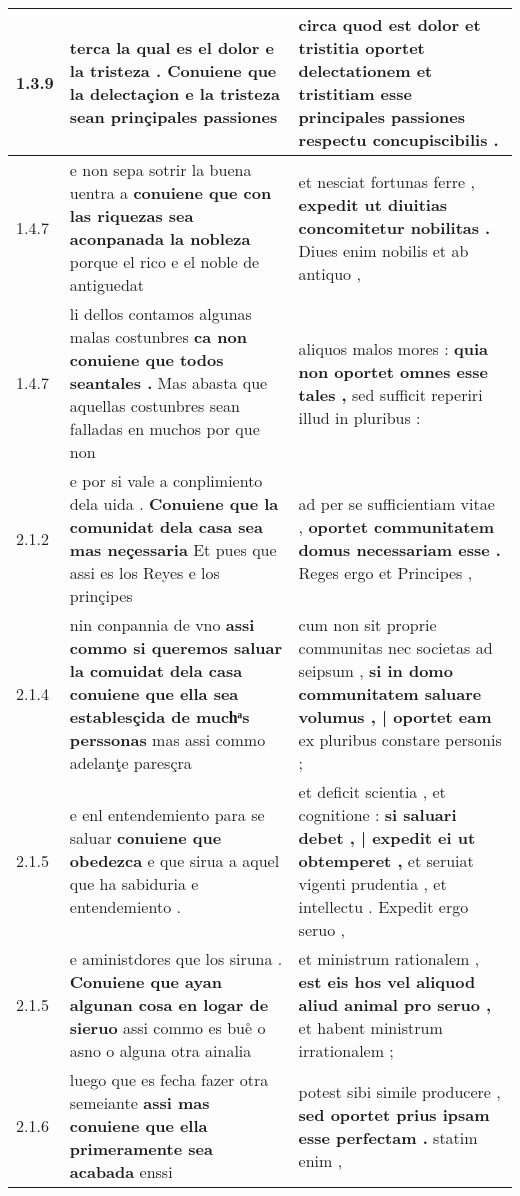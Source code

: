 \begin{tabular}{|p{1cm}|p{6.5cm}|p{6.5cm}|}
1.3.9 & terca la qual es el dolor e la tristeza . \textbf{ Conuiene que la delectaçion e la tristeza } sean prinçipales passiones & circa quod est dolor et tristitia \textbf{ oportet delectationem et tristitiam } esse principales passiones respectu concupiscibilis . \\\hline
1.4.7 & e non sepa sotrir la buena uentra a \textbf{ conuiene que con las riquezas sea aconpanada la nobleza } porque el rico e el noble de antiguedat & et nesciat fortunas ferre , \textbf{ expedit ut diuitias concomitetur nobilitas . } Diues enim nobilis et ab antiquo , \\\hline
1.4.7 & li dellos contamos algunas malas costunbres \textbf{ ca non conuiene que todos seantales . } Mas abasta que aquellas costunbres sean falladas en muchos por que non & aliquos malos mores : \textbf{ quia non oportet omnes esse tales , } sed sufficit reperiri illud in pluribus : \\\hline
2.1.2 & e por si vale a conplimiento dela uida . \textbf{ Conuiene que la comunidat dela casa sea mas neçessaria } Et pues que assi es los Reyes e los prinçipes & ad per se sufficientiam vitae , \textbf{ oportet communitatem domus necessariam esse . } Reges ergo et Principes , \\\hline
2.1.4 & nin conpannia de vno \textbf{ assi commo si queremos saluar la comuidat dela casa conuiene que ella sea establesçida de muchͣs perssonas } mas assi commo adelanţe paresçra & cum non sit proprie communitas nec societas ad seipsum , \textbf{ si in domo communitatem saluare volumus , | oportet eam } ex pluribus constare personis ; \\\hline
2.1.5 & e enl entendemiento para se saluar \textbf{ conuiene que obedezca } e que sirua a aquel que ha sabiduria e entendemiento . & et deficit scientia , et cognitione : \textbf{ si saluari debet , | expedit ei ut obtemperet , } et seruiat vigenti prudentia , et intellectu . Expedit ergo seruo , \\\hline
2.1.5 & e aministdores que los siruna . \textbf{ Conuiene que ayan algunan cosa en logar de sieruo } assi commo es bue̊ o asno o alguna otra ainalia & et ministrum rationalem , \textbf{ est eis hos vel aliquod aliud animal pro seruo , } et habent ministrum irrationalem ; \\\hline
2.1.6 & luego que es fecha fazer otra semeiante \textbf{ assi mas conuiene que ella primeramente sea acabada } enssi & potest sibi simile producere , \textbf{ sed oportet prius ipsam esse perfectam . } statim enim , \\\hline

\end{tabular}
